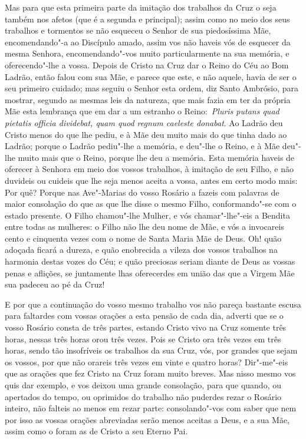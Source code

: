 Mas para que esta primeira parte da imitação dos trabalhos
da Cruz o seja também nos afetos (que é a segunda e principal); assim
como no meio dos seus trabalhos e tormentos se não esqueceu o Senhor de
sua piedosíssima Mãe, encomendando"-a ao Discípulo amado, assim vos não
haveis vós de esquecer da mesma Senhora, encomendando"-vos muito
particularmente na sua memória, e oferecendo"-lhe a vossa. Depois de
Cristo na Cruz dar o Reino do Céu ao Bom Ladrão, então falou com sua
Mãe, e parece que este, e não aquele, havia de ser o seu primeiro
cuidado; mas seguiu o Senhor esta ordem, diz Santo Ambrósio, para
mostrar, segundo as mesmas leis da natureza, que mais fazia em ter da
própria Mãe esta lembrança que em dar a um estranho o
Reino:~\emph{Pluris putans quad pietatis officia dividebat, quam quod
regnum caeleste donabat}. Ao Ladrão deu Cristo menos do que lhe pediu, e
à Mãe deu muito mais do que tinha dado ao Ladrão; porque o Ladrão
pediu"-lhe a memória, e deu"-lhe o Reino, e à Mãe deu"-lhe muito mais que o
Reino, porque lhe deu a memória. Esta memória haveis de oferecer à
Senhora em meio dos vossos trabalhos, à imitação de seu Filho, e não
duvideis ou cuideis que lhe seja menos aceita a vossa, antes em certo
modo mais: Por quê? Porque nas Ave"-Marias do vosso Rosário a fazeis com
palavras de maior consolação do que as que lhe disse o mesmo Filho,
conformando"-se com o estado presente. O Filho chamou"-lhe Mulher, e vós
chamar"-lhe"-eis a Bendita entre todas as mulheres: o Filho não lhe deu
nome de Mãe, e vós a invocareis cento e cinquenta vezes com o nome de
Santa Maria Mãe de Deus. Oh! quão adoçada ficará a dureza, e quão
enobrecida a vileza dos vossos trabalhos na harmonia destas vozes do
Céu; e quão preciosas seriam diante de Deus as vossas penas e aflições,
se juntamente lhas oferecerdes em união das que a Virgem Mãe sua padeceu
ao pé da Cruz!

E por que a continuação do vosso mesmo trabalho vos não
pareça bastante escusa para faltardes com vossas orações a esta pensão
de cada dia, adverti que se o vosso Rosário consta de três partes,
estando Cristo vivo na Cruz somente três horas, nessas três horas orou
três vezes. Pois se Cristo ora três vezes em três horas, sendo tão
insofríveis os trabalhos da sua Cruz, vós, por grandes que sejam os
vossos, por que não orareis três vezes em vinte e quatro horas?
Dir"-me"-eis que as orações que fez Cristo na Cruz foram muito breves. Mas
nisso mesmo vos quis dar exemplo, e vos deixou uma grande consolação,
para que quando, ou apertados do tempo, ou oprimidos do trabalho não
puderdes rezar o Rosário inteiro, não falteis ao menos em rezar parte:
consolando"-vos com saber que nem por isso as vossas orações abreviadas
serão menos aceitas a Deus, e a sua Mãe, assim como o foram as de Cristo
a seu Eterno Pai.

